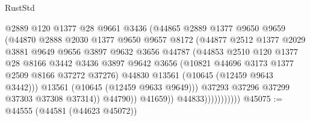 \begin{lexlean}{RustStd}
\begin{coremodule}
                                  @2889
                                  @120
                                  @1377
                                  @28
                                  @9661
                                  @3436
                                  (@44865
                                    @2889
                                    @1377
                                    @9650
                                    @9659
                                    (@44870
                                      @2888
                                      @2030
                                      @1377
                                      @9650
                                      @9657
                                      @8172
                                      (@44877
                                        @2512
                                        @1377
                                        @2029
                                        @3881
                                        @9649
                                        @9656
                                        @3897
                                        @9632
                                        @3656
                                        @44787
                                        (@44853
                                          @2510
                                          @120
                                          @1377
                                          @28
                                          @8166
                                          @3442
                                          @3436
                                          @3897
                                          @9642
                                          @3656
                                          (@10821 @44696 @3173 @1377 @2509 @8166 @37272 @37276)
                                          @44830
                                          @13561
                                          (@10645 (@12459 @9643 @3442)))
                                        @13561
                                        (@10645 (@12459 @9633 @9649)))
                                      @37293
                                      @37296
                                      @37299
                                      @37303
                                      @37308
                                      @37314))
                                  @44790))
                              @41659))
                          @44833)))))))))))
@45075 := @44555 (@44581 (@44623 @45072))

\end{coremodule}
\end{lexlean}
